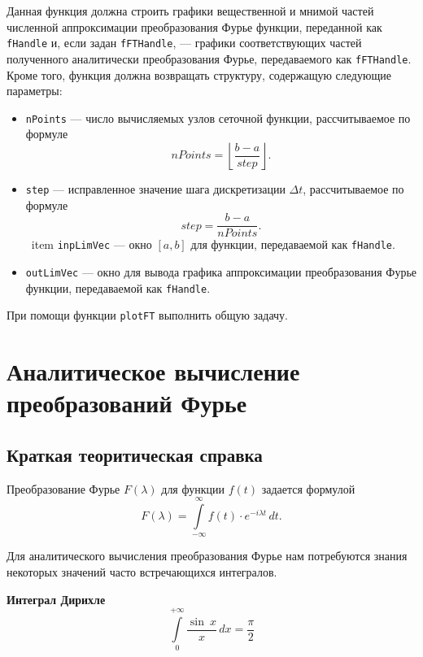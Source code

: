 \documentclass[a4paper, 11pt]{article}
\newcommand{\myint}[4]{\int\limits_{#1}^{#2}#3\,d#4}
\begin{document}
        Данная функция должна строить графики вещественной и мнимой частей численной аппроксимации преобразования Фурье функции, переданной как \texttt{fHandle} и, если задан \texttt{fFTHandle}, --- графики соответствующих частей полученного аналитически преобразования Фурье, передаваемого как \texttt{fFTHandle}. 
        Кроме того, функция должна возвращать структуру, содержащую следующие параметры:
        \begin{itemize}
            \item \texttt{nPoints} --- число вычисляемых узлов сеточной функции, рассчитываемое по формуле
                $$
                    nPoints = \left \lfloor \frac{b- a}{step} \right \rfloor.        
                $$
            \item \texttt{step} --- исправленное значение шага дискретизации $\Delta t$, рассчитываемое по формуле
                $$
                    step = \frac{b-a}{nPoints}.
                $$
            \
item \texttt{inpLimVec} --- окно $[a, b]$ для функции, передаваемой как \texttt{fHandle}.
            \item \texttt{outLimVec} --- окно для вывода графика аппроксимации преобразования Фурье функции, передаваемой как \texttt{fHandle}.
        \end{itemize}          
        
        При помощи функции \texttt{plotFT} выполнить общую задачу.

\clearpage
\section{Аналитическое вычисление преобразований Фурье}
    \subsection{Краткая теоритическая справка} 
        Преобразование Фурье $F(\lambda)$ для функции $f(t)$ задается формулой
        \begin{equation} \label{eq:fourier}
            F(\lambda) = \myint{-\infty}{\infty}{f(t)\cdot e^{-i\lambda t}}{t}.
        \end{equation}       
        
        Для аналитического вычисления преобразования Фурье нам потребуются знания некоторых значений часто встречающихся интегралов.
        
        \textbf{Интеграл Дирихле}
        \begin{equation} \label{eq:Dirichlet_integral}
            \myint{0}{+\infty}{\frac{\sin \: x}{x}}{x} = \frac{\pi}{2}
        \end{equation}
        
\end{document}
